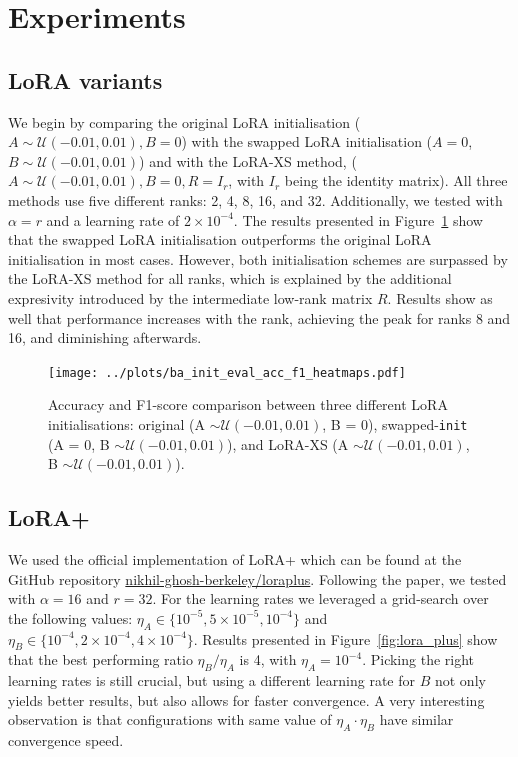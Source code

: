 \documentclass[a4paper,10pt,twocolumn,english]{article}
\begin{document}
\section{Experiments}

\subsection{LoRA variants}

We begin by comparing the original LoRA initialisation ($A \sim \mathcal{U}(-0.01, 0.01), B = 0$) with the swapped LoRA initialisation ($A = 0$, $B \sim \mathcal{U}(-0.01, 0.01)$) and with the LoRA-XS method, ($A \sim \mathcal{U}(-0.01, 0.01), B = 0, R = I_r$, with $I_r$ being the identity matrix). All three methods use five different ranks: 2, 4, 8, 16, and 32. Additionally, we tested with $\alpha = r$ and a learning rate of $2 \times 10 ^ {-4}$. The results presented in Figure~\ref{fig:ba_init} show that the swapped LoRA initialisation outperforms the original LoRA initialisation in most cases. However, both initialisation schemes are surpassed by the LoRA-XS method for all ranks, which is explained by the additional expresivity introduced by the intermediate low-rank matrix $R$. Results show as well that performance increases with the rank, achieving the peak for ranks 8 and 16, and diminishing afterwards.

\begin{figure}[ht]
    \centering
    \texttt{[image: ../plots/ba\_init\_eval\_acc\_f1\_heatmaps.pdf]}
    \caption{Accuracy and F1-score comparison between three different LoRA initialisations: original (A $\sim \mathcal{U}(-0.01, 0.01)$, B = 0), swapped-\texttt{init} (A = 0, B $\sim \mathcal{U}(-0.01, 0.01)$), and LoRA-XS (A $\sim \mathcal{U}(-0.01, 0.01)$, B $\sim \mathcal{U}(-0.01, 0.01)$).}
    \label{fig:ba_init}
\end{figure}



\subsection{LoRA+}

We used the official implementation of LoRA+ which can be found at the GitHub repository \href{https://github.com/nikhil-ghosh-berkeley/loraplus}{nikhil-ghosh-berkeley/loraplus}. Following the paper, we tested with $\alpha = 16$ and $r = 32$. For the learning rates we leveraged a grid-search over the following values: $\eta_A \in \{10^{-5}, 5 \times 10^{-5}, 10^{-4}\}$ and $\eta_B \in \{10^{-4}, 2 \times 10^{-4}, 4 \times 10^{-4}\}$. Results presented in Figure~\ref{fig:lora_plus} show that the best performing ratio $\eta_B / \eta_A$ is 4, with $\eta_A = 10^{-4}$. Picking the right learning rates is still crucial, but using a different learning rate for $B$ not only yields better results, but also allows for faster convergence. A very interesting observation is that configurations with same value of $\eta_A \cdot \eta_B$ have similar convergence speed.
\end{document}
